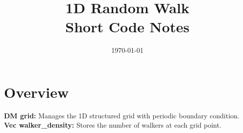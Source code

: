 \documentclass[11pt,a4paper]{article}
\title{1D Random Walk\\Short Code Notes}
\author{}
\date{\today}
\begin{document}
\maketitle

\section{Overview}
\textbf{DM grid:} Manages the 1D structured grid with periodic boundary condition.\\
\textbf{Vec walker\_density:} Stores the number of walkers at each grid point.
\end{document}
